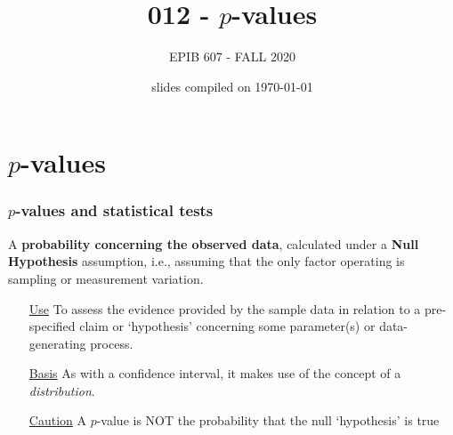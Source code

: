 \documentclass[10pt,handout]{beamer}\usepackage[]{graphicx}\usepackage[]{color}
\begin{document}
	


	\title{012 - $p$-values}
\author{EPIB 607 - FALL 2020}

\date{slides compiled on \today}

\maketitle

\section{$p$-values}
\begin{frame}
	\frametitle{$p$-values and statistical tests}
	
	
	\begin{defm}[$p$-value]
		A \textbf{probability concerning the observed data}, calculated under a \textbf{Null Hypothesis} assumption, i.e., assuming that the only factor operating is sampling or measurement variation. 
	\end{defm}
	
	\begin{itemize} 
		\item[\underline{Use}] To assess the evidence provided by the sample data
		in relation to a pre-specified claim or `hypothesis' concerning some parameter(s) or data-generating process. 
		\item[\underline{Basis}] As with a confidence interval, it makes use of the concept of a \textit{distribution}. 
		\item[\underline{Caution}] A $p$-value is NOT the probability that the null `hypothesis' is true
	\end{itemize}
\end{frame}
\end{document}
